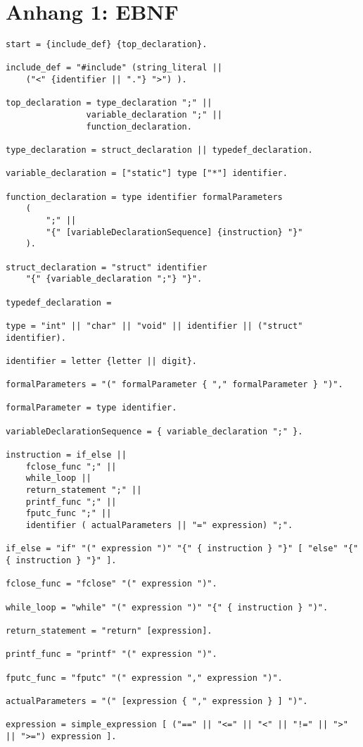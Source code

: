 \documentclass[a4paper]{article}
\begin{document}
	\section{Anhang 1: EBNF}
	\begin{lstlisting}
start = {include_def} {top_declaration}.

include_def = "#include" (string_literal ||
	("<" {identifier || "."} ">") ).

top_declaration = type_declaration ";" ||
				variable_declaration ";" ||
				function_declaration.

type_declaration = struct_declaration || typedef_declaration.

variable_declaration = ["static"] type ["*"] identifier.

function_declaration = type identifier formalParameters
	(
		";" ||
		"{" [variableDeclarationSequence] {instruction} "}"
	).

struct_declaration = "struct" identifier
	"{" {variable_declaration ";"} "}".

typedef_declaration =

type = "int" || "char" || "void" || identifier || ("struct" identifier).

identifier = letter {letter || digit}.

formalParameters = "(" formalParameter { "," formalParameter } ")".

formalParameter = type identifier.

variableDeclarationSequence = { variable_declaration ";" }.

instruction = if_else ||
	fclose_func ";" ||
	while_loop ||
	return_statement ";" ||
	printf_func ";" ||
	fputc_func ";" ||
	identifier ( actualParameters || "=" expression) ";".

if_else = "if" "(" expression ")" "{" { instruction } "}" [ "else" "{" { instruction } "}" ].

fclose_func = "fclose" "(" expression ")".

while_loop = "while" "(" expression ")" "{" { instruction } ")".

return_statement = "return" [expression].

printf_func = "printf" "(" expression ")".

fputc_func = "fputc" "(" expression "," expression ")".

actualParameters = "(" [expression { "," expression } ] ")".

expression = simple_expression [ ("==" || "<=" || "<" || "!=" || ">" || ">=") expression ].


\end{lstlisting}
\end{document}
